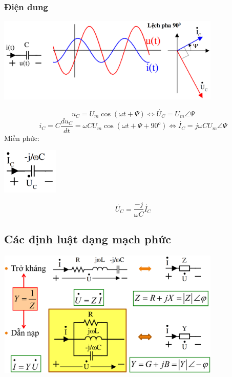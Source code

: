 \subsubsection{Điện dung}
\begin{center}
    \includegraphics[width = 0.8\textwidth]{./image/41.png}
\end{center}
\begin{equation}
    u_C = U_m \cos (\omega t + \varPsi) \Leftrightarrow \dot{U_C} = U_m \angle \varPsi
\end{equation}
\begin{equation}
    i_C = C \frac{du_C}{dt} = \omega C U_m \cos (\omega t + \varPsi + 90^o) \Leftrightarrow \dot{I_C} = j\omega C U_m \angle \varPsi
\end{equation}
Miền phức:
\begin{center}
    \includegraphics[width = 0.2\textwidth]{./image/42.png}
\end{center}
\begin{equation}
    \dot{U_C} = \frac{-j}{\omega C} \dot{I_C}
\end{equation}
\subsection{Các định luật dạng mạch phức}
\begin{center}
    \includegraphics[width = 0.8\textwidth]{./image/43.png}
\end{center}
